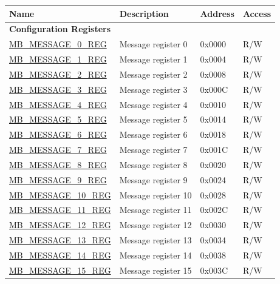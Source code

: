 \begin{longtable}{ | p{6cm} | p{7.2cm} | p{1.3cm} | p{1cm} | }
\hline\rowcolor{lightgray}
\textbf{Name} & \textbf{Description} &  \textbf{Address} & \textbf{Access} \\ \hline
\endhead
\multicolumn{4}{|l|}{\textbf{Configuration Registers}} \\ \hline
\hyperref[regdesc:MBMESSAGE0REG]{MB\_MESSAGE\_0\_REG} & Message register 0 & 0x0000 & R/W \\ \hline
\hyperref[regdesc:MBMESSAGE1REG]{MB\_MESSAGE\_1\_REG} & Message register 1 & 0x0004 & R/W \\ \hline
\hyperref[regdesc:MBMESSAGE2REG]{MB\_MESSAGE\_2\_REG} & Message register 2 & 0x0008 & R/W \\ \hline
\hyperref[regdesc:MBMESSAGE3REG]{MB\_MESSAGE\_3\_REG} & Message register 3& 0x000C & R/W \\ \hline
\hyperref[regdesc:MBMESSAGE4REG]{MB\_MESSAGE\_4\_REG} & Message register 4& 0x0010 & R/W \\ \hline
\hyperref[regdesc:MBMESSAGE5REG]{MB\_MESSAGE\_5\_REG} & Message register 5& 0x0014 & R/W \\ \hline
\hyperref[regdesc:MBMESSAGE6REG]{MB\_MESSAGE\_6\_REG} & Message register 6& 0x0018 & R/W \\ \hline
\hyperref[regdesc:MBMESSAGE7REG]{MB\_MESSAGE\_7\_REG} & Message register 7& 0x001C & R/W \\ \hline
\hyperref[regdesc:MBMESSAGE8REG]{MB\_MESSAGE\_8\_REG} & Message register 8& 0x0020 & R/W \\ \hline
\hyperref[regdesc:MBMESSAGE9REG]{MB\_MESSAGE\_9\_REG} & Message register 9& 0x0024 & R/W \\ \hline
\hyperref[regdesc:MBMESSAGE10REG]{MB\_MESSAGE\_10\_REG} & Message register 10& 0x0028 & R/W \\ \hline
\hyperref[regdesc:MBMESSAGE11REG]{MB\_MESSAGE\_11\_REG} & Message register 11& 0x002C & R/W \\ \hline
\hyperref[regdesc:MBMESSAGE12REG]{MB\_MESSAGE\_12\_REG} & Message register 12& 0x0030 & R/W \\ \hline
\hyperref[regdesc:MBMESSAGE13REG]{MB\_MESSAGE\_13\_REG} & Message register 13& 0x0034 & R/W \\ \hline
\hyperref[regdesc:MBMESSAGE14REG]{MB\_MESSAGE\_14\_REG} & Message register 14& 0x0038 & R/W \\ \hline
\hyperref[regdesc:MBMESSAGE15REG]{MB\_MESSAGE\_15\_REG} & Message register 15& 0x003C & R/W \\ \hline

\end{longtable}
